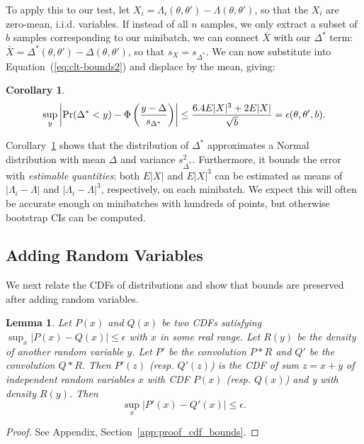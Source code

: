 \documentclass{article}
\newtheorem{lemma}{Lemma}
\newtheorem{corollary}{Corollary}
\begin{document}
To apply this to our test, let $X_i = \Lambda_i(\theta,\theta') -
\Lambda(\theta,\theta')$, so that the $X_i$ are zero-mean, i.i.d. variables. If
instead of all $n$ samples, we only extract a subset of $b$ samples
corresponding to our minibatch, we can connect $\bar{X}$ with our $\Delta^*$
term: $\bar{X} = \Delta^*(\theta,\theta') - \Delta(\theta,\theta')$, so that
$s_X = s_{\Delta^*}$. We can now substitute into Equation~(\ref{eq:clt-bounds2}) and displace by the mean, giving:


\begin{corollary}\label{cor:our_bound_delta_prime}
\begin{equation}
    \sup_y\left|{\rm Pr}(\Delta^*< y) - \Phi\left(\frac{y-\Delta}{s_{\Delta^*}}\right)\right| \leq \frac{6.4E|X|^3+2E|X|}{\sqrt{b}}
    = \epsilon(\theta,\theta',b).
\end{equation}
\end{corollary} %
Corollary~\ref{cor:our_bound_delta_prime} shows that the distribution of
$\Delta^*$ approximates a Normal distribution with mean $\Delta$ and variance
$s^2_{\Delta^*}$. Furthermore, it bounds the error with \emph{estimable
quantities}: both $E|X|$ and $E|X|^3$ can be estimated as means of $|\Lambda_i
- \Lambda|$ and $|\Lambda_i - \Lambda|^3$, respectively, on each minibatch. We
expect this will often be accurate enough on minibatches with hundreds of
points, but otherwise bootstrap CIs can be computed.



\subsection{Adding Random Variables}\label{ssec:preserve_bounds}

We next relate the CDFs of distributions and show that bounds are preserved
after adding random variables.

\begin{lemma}\label{lem:cdf_bounds}
Let $P(x)$ and $Q(x)$ be two CDFs satisfying
$\sup_x|P(x)-Q(x)|\leq \epsilon$ with $x$ in some real range. Let $R(y)$ be the
{\em density} of another random variable $y$. Let $P'$ be the convolution $P*R$
and $Q'$ be the convolution $Q*R$. Then $P'(z)$ (resp. $Q'(z)$) is the CDF of
sum $z=x+y$ of independent random variables $x$ with CDF $P(x)$ (resp. $Q(x)$)
and y with density $R(y)$.  Then
\begin{equation}
    \sup_x|P'(x)-Q'(x)|\leq \epsilon.
\end{equation}
\end{lemma}
\begin{proof}
See Appendix, Section~\ref{app:proof_cdf_bounds}.
\end{proof}
\end{document}
